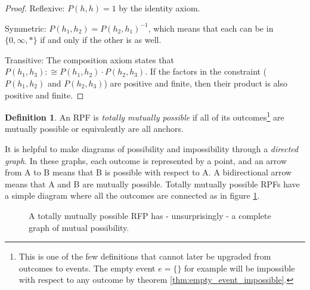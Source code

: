 \documentclass[twoside]{article}
\theoremstyle{plain}%
\theoremstyle{definition}
\newtheorem{definition}{Definition}[section]
\theoremstyle{remark}
\begin{document}
\begin{proof}
Reflexive: \(P(h, h) = 1\) by the identity axiom.

Symmetric: \(P(h_1, h_2) = P(h_2, h_1)^{-1}\), which means that each can be in \(\{0, \infty, \ast\}\) if and only if the other is as well.

Transitive:  The composition axiom states that \(P(h_1, h_3) :\cong P(h_1, h_2) \cdot P(h_2, h_3)\). If the factors in the constraint (\(P(h_1, h_2)\) and \(P(h_2, h_3)\)) are positive and finite, then their product is also positive and finite.
\end{proof}

\begin{definition}
\label{def:totally_mutually_possible}
An RPF is \textit{totally mutually possible} if all of its outcomes\footnote{This is one of the few definitions that cannot later be upgraded from outcomes to events. The empty event \(e = \{\}\) for example will be impossible with respect to any outcome by theorem \ref{thm:empty_event_impossible}.} are mutually possible or equivalently are all anchors.
\end{definition}

It is helpful to make diagrams of possibility and impossibility through a \textit{directed graph}. In these graphs, each outcome is represented by a point, and an arrow from A to B means that B is possible with respect to A. A bidirectional arrow means that A and B are mutually possible. Totally mutually possible RPFs have a simple diagram where all the outcomes are connected as in figure \ref{fig:mutually_possible_rpf}.

\begin{figure}[h]
\centering
{}
\caption{A totally mutually possible RFP has - unsurprisingly - a complete graph of mutual possibility.}
\label{fig:mutually_possible_rpf}
\end{figure}
\end{document}
